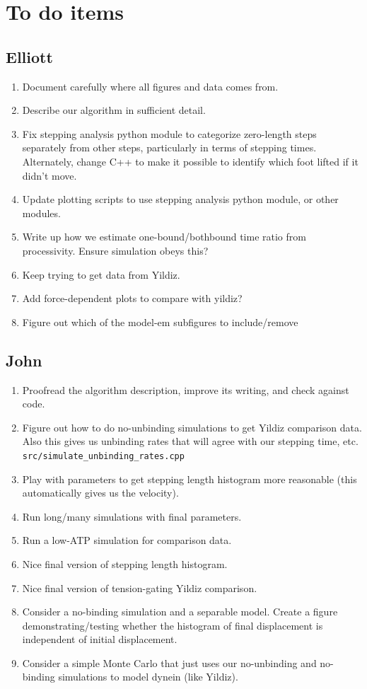 \documentclass[9pt,twocolumn,twoside]{pnas-new}
\begin{document}
\section{To do items}

\subsection{Elliott}
\begin{enumerate}
\item Document carefully where all figures and data comes from.
\item Describe our algorithm in sufficient detail.
\item Fix stepping analysis python module to categorize zero-length
  steps separately from other steps, particularly in terms of stepping
  times.  Alternately, change C++ to make it possible to identify
  which foot lifted if it didn't move.
\item Update plotting scripts to use stepping analysis python module,
  or other modules.
\item Write up how we estimate one-bound/bothbound time ratio from
  processivity.  Ensure simulation obeys this?
\item Keep trying to get data from Yildiz.
\item Add force-dependent plots to compare with yildiz?
\item Figure out which of the model-em subfigures to include/remove
\end{enumerate}

\subsection{John}
\begin{enumerate}
\item Proofread the algorithm description, improve its writing, and
  check against code.
\item Figure out how to do no-unbinding simulations to get Yildiz
  comparison data.  Also this gives us unbinding rates that will agree
  with our stepping time, etc. \verb!src/simulate_unbinding_rates.cpp!
\item Play with parameters to get stepping length histogram more
  reasonable (this automatically gives us the velocity).
\item Run long/many simulations with final parameters.
\item Run a low-ATP simulation for comparison data.
\item Nice final version of stepping length histogram.
\item Nice final version of tension-gating Yildiz comparison.
\item Consider a no-binding simulation and a separable model.  Create
  a figure demonstrating/testing whether the histogram of final
  displacement is independent of initial displacement.
\item Consider a simple Monte Carlo that just uses our no-unbinding
  and no-binding simulations to model dynein (like Yildiz).
\end{enumerate}
\end{document}
